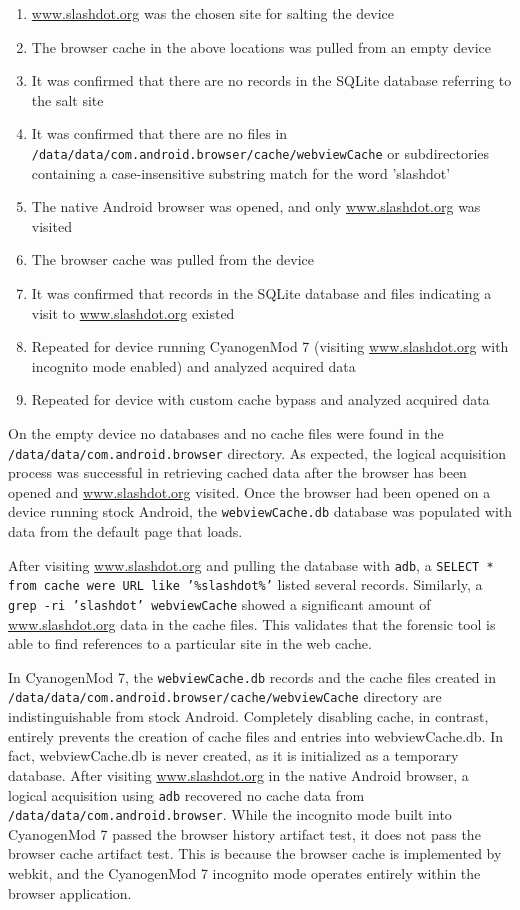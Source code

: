 \begin{enumerate}
\item \url{www.slashdot.org} was  the chosen site for salting the device
\item The browser cache in the above locations was pulled from an empty device
\item It was confirmed that there are no records in the SQLite database referring to the salt site
\item It was confirmed that there are no files in \texttt{/data/data/com.android.browser/cache/webviewCache} or subdirectories containing a case-insensitive substring match for the word 'slashdot'
\item The native Android browser was opened, and only \url{www.slashdot.org} was visited
\item The browser cache was pulled from the device
\item It was confirmed that records in the SQLite database and files indicating a visit to \url{www.slashdot.org} existed
\item Repeated for device running CyanogenMod 7 (visiting \url{www.slashdot.org} with incognito mode enabled) and analyzed acquired data
\item Repeated for device with custom cache bypass and analyzed acquired data
\end{enumerate}

On the empty device no databases and no cache files were found in the \texttt{/data/data/com.android.browser} directory.  As
expected, the logical acquisition process was successful in retrieving cached data after the browser has been opened and
\url{www.slashdot.org} visited.  Once the browser had been opened on a device running stock Android, the \texttt{webviewCache.db}
database was populated with data from the default page that loads. 

After visiting \url{www.slashdot.org} and pulling the database with \texttt{adb}, a \texttt{SELECT * from cache were URL like
'\%slashdot\%'} listed several records.  Similarly, a \texttt{grep -ri 'slashdot' webviewCache} showed a significant amount of
\url{www.slashdot.org} data in the cache files.  This validates that the forensic tool is able to find references to a particular
site in the web cache.

In CyanogenMod 7, the \texttt{webviewCache.db} records and the cache files created in
\texttt{/data/data/com.android.browser/cache/webviewCache} directory are indistinguishable from stock Android.  Completely disabling
cache, in contrast, entirely prevents the creation of cache files and entries into webviewCache.db.  In fact, webviewCache.db is
never created, as it is initialized as a temporary database.  After visiting \url{www.slashdot.org} in the native Android browser, a
logical acquisition using \texttt{adb} recovered no cache data from \texttt{/data/data/com.android.browser}.  While the incognito
mode built into CyanogenMod 7 passed the browser history artifact test, it does not pass the browser cache artifact test. This is
because the browser cache is implemented by webkit, and the CyanogenMod 7 incognito mode operates entirely within the browser
application. 

